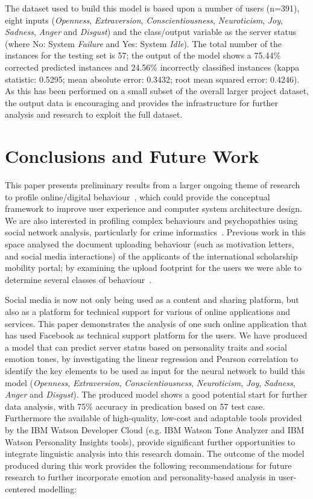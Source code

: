 \documentclass[graybox]{svmult}
\begin{document}
{{{The dataset used to build this model is based upon a number of users
(n=391), eight inputs ({\emph{Openness}}, {\emph{Extraversion}},
{\emph{Conscientiousness}}, {\emph{Neuroticism}}, {\emph{Joy}},
{\emph{Sadness}}, {\emph{Anger}} and {\emph{Disgust}}) and the
class/output variable as the server status (where No: System
{\emph{Failure}} and Yes: System {\emph{Idle}}). The total number of
the instances for the testing set is 57; the output of the model shows
a 75.44\% corrected predicted instances and 24.56\% incorrectly
classified instances (kappa statistic: 0.5295; mean absolute error:
0.3432; root mean squared error: 0.4246). As this has been performed
on a small subset of the overall larger project dataset, the output
data is encouraging and provides the infrastructure for further
analysis and research to exploit the full dataset.

\section{Conclusions and Future Work}\label{conclusions}

This paper presents preliminary results from a larger ongoing theme of
research to profile online/digital
behaviour~\citep{oatley+crick:2014,oatley-et-al_dasc2015}, which could
provide the conceptual framework to improve user experience and
computer system architecture design. We are also interested in
profiling complex behaviours and psychopathies using social network
analysis, particularly for crime
informatics~\cite{oatley+crick:2015}. Previous work in this space
analysed the document uploading behaviour (such as motivation letters,
and social media interactions) of the applicants of the international
scholarship mobility portal; by examining the upload footprint for the
users we were able to determine several classes of
behaviour~\citep{oatley-et-al-soccogcomp2015}.

Social media is now not only being used as a content and sharing
platform, but also as a platform for technical support for various of
online applications and services. This paper demonstrates the analysis
of one such online application that has used Facebook as technical
support platform for the users. We have produced a model that can
predict server status based on personality traits and social emotion
tones, by investigating the linear regression and Pearson correlation
to identify the key elements to be used as input for the neural
network to build this model ({\emph{Openness}}, {\emph{Extraversion}},
{\emph{Conscientiousness}}, {\emph{Neuroticism}}, {\emph{Joy}},
{\emph{Sadness}}, {\emph{Anger}} and {\emph{Disgust}}). The produced
model shows a good potential start for further data analysis, with
75\% accuracy in predication based on 57 test case. Furthermore the
available of high-quality, low-cost and adaptable tools provided by
the IBM Watson Developer Cloud (e.g. IBM Watson Tone Analyzer and IBM
Watson Personality Insights tools), provide significant further
opportunities to integrate linguistic analysis into this research
domain. The outcome of the model produced during this work provides
the following recommendations for future research to further
incorporate emotion and personality-based analysis in user-centered
modelling:

}}}
\end{document}
